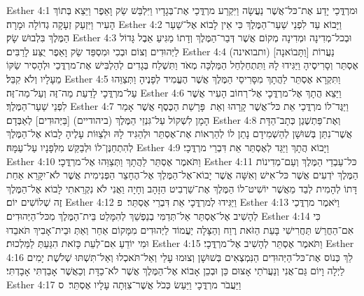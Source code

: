 Esther 4:1	וּמרְדֳּכַי יָדַע אֶת־כּל־אֲשֶׁר נַעֲשָׂה וַיִּקְרַע מרְדֳּכַי אֶת־בְּגָדָיו וַיִּלְבַּשׁ שַׂק וָאֵפֶר וַיֵּצֵא בְּתוֹךְ הָעִיר וַיִּזְעַק זְעָקָה גְדוֹלָה וּמָרָה׃
Esther 4:2	וַיָּבוֹא עַד לִפְנֵי שַׁעַר־הַמֶּלֶךְ כִּי אֵין לָבוֹא אֶל־שַׁעַר הַמֶּלֶךְ בִּלְבוּשׁ שָׂק׃
Esther 4:3	וּבְכל־מְדִינָה וּמְדִינָה מְקוֹם אֲשֶׁר דְּבַר־הַמֶּלֶךְ וְדָתוֹ מַגִּיעַ אֵבֶל גָּדוֹל לַיְּהוּדִים וְצוֹם וּבְכִי וּמִסְפֵּד שַׂק וָאֵפֶר יֻצַּע לָרַבִּים׃
Esther 4:4	(ותבואינה) [וַתָּבוֹאנָה] נַעֲרוֹת אֶסְתֵּר וְסָרִיסֶיהָ וַיַּגִּידוּ לָהּ וַתִּתְחַלְחַל הַמַּלְכָּה מְאֹד וַתִּשְׁלַח בְּגָדִים לְהַלְבִּישׁ אֶת־מרְדֳּכַי וּלְהָסִיר שַׂקּוֹ מֵעָלָיו וְלֹא קִבֵּל׃
Esther 4:5	וַתִּקְרָא אֶסְתֵּר לַהֲתָךְ מִסָּרִיסֵי הַמֶּלֶךְ אֲשֶׁר הֶעֱמִיד לְפָנֶיהָ וַתְּצַוֵּהוּ עַל־מרְדֳּכָי לָדַעַת מַה־זֶּה וְעַל־מַה־זֶּה׃
Esther 4:6	וַיֵּצֵא הֲתָךְ אֶל־מרְדֳּכָי אֶל־רְחוֹב הָעִיר אֲשֶׁר לִפְנֵי שַׁעַר־הַמֶּלֶךְ׃
Esther 4:7	וַיַּגֶּד־לוֹ מרְדֳּכַי אֵת כּל־אֲשֶׁר קָרָהוּ וְאֵת  פָּרָשַׁת הַכֶּסֶף אֲשֶׁר אָמַר הָמָן לִשְׁקוֹל עַל־גִּנְזֵי הַמֶּלֶךְ (ביהודיים) [בַּיְּהוּדִים] לְאַבְּדָם׃
Esther 4:8	וְאֶת־פַּתְשֶׁגֶן כְּתָב־הַדָּת אֲשֶׁר־נִתַּן בְּשׁוּשָׁן לְהַשְׁמִידָם נָתַן לוֹ לְהַרְאוֹת אֶת־אֶסְתֵּר וּלְהַגִּיד לָהּ וּלְצַוּוֹת עָלֶיהָ לָבוֹא אֶל־הַמֶּלֶךְ לְהִתְחַנֶּן־לוֹ וּלְבַקֵּשׁ מִלְּפָנָיו עַל־עַמָּהּ׃
Esther 4:9	וַיָּבוֹא הֲתָךְ וַיַּגֵּד לְאֶסְתֵּר אֵת דִּבְרֵי מרְדֳּכָי׃
Esther 4:10	וַתֹּאמֶר אֶסְתֵּר לַהֲתָךְ וַתְּצַוֵּהוּ אֶל־מרְדֳּכָי׃
Esther 4:11	כּל־עַבְדֵי הַמֶּלֶךְ וְעַם־מְדִינוֹת הַמֶּלֶךְ יֹדְעִים אֲשֶׁר כּל־אִישׁ וְאִשָּׁה אֲשֶׁר יָבוֹא־אֶל־הַמֶּלֶךְ אֶל־הֶחָצֵר הַפְּנִימִית אֲשֶׁר לֹא־יִקָּרֵא אַחַת דָּתוֹ לְהָמִית לְבַד מֵאֲשֶׁר יוֹשִׁיט־לוֹ הַמֶּלֶךְ אֶת־שַׁרְבִיט הַזָּהָב וְחָיָה וַאֲנִי לֹא נִקְרֵאתִי לָבוֹא אֶל־הַמֶּלֶךְ זֶה שְׁלוֹשִׁים יוֹם׃
Esther 4:12	וַיַּגִּידוּ לְמרְדֳּכָי אֵת דִּבְרֵי אֶסְתֵּר׃ {פ}
Esther 4:13	וַיֹּאמֶר מרְדֳּכַי לְהָשִׁיב אֶל־אֶסְתֵּר אַל־תְּדַמִּי בְנַפְשֵׁךְ לְהִמָּלֵט בֵּית־הַמֶּלֶךְ מִכּל־הַיְּהוּדִים׃
Esther 4:14	כִּי אִם־הַחֲרֵשׁ תַּחֲרִישִׁי בָּעֵת הַזֹּאת רֶוַח וְהַצָּלָה יַעֲמוֹד לַיְּהוּדִים מִמָּקוֹם אַחֵר וְאַתְּ וּבֵית־אָבִיךְ תֹּאבֵדוּ וּמִי יוֹדֵעַ אִם־לְעֵת כָּזֹאת הִגַּעַתְּ לַמַּלְכוּת׃
Esther 4:15	וַתֹּאמֶר אֶסְתֵּר לְהָשִׁיב אֶל־מרְדֳּכָי׃
Esther 4:16	לֵךְ כְּנוֹס אֶת־כּל־הַיְּהוּדִים הַנִּמְצְאִים בְּשׁוּשָׁן וְצוּמוּ עָלַי וְאַל־תֹּאכְלוּ וְאַל־תִּשְׁתּוּ שְׁלֹשֶׁת יָמִים לַיְלָה וָיוֹם גַּם־אֲנִי וְנַעֲרֹתַי אָצוּם כֵּן וּבְכֵן אָבוֹא אֶל־הַמֶּלֶךְ אֲשֶׁר לֹא־כַדָּת וְכַאֲשֶׁר אָבַדְתִּי אָבָדְתִּי׃
Esther 4:17	וַיַּעֲבֹר מרְדֳּכָי וַיַּעַשׂ כְּכֹל אֲשֶׁר־צִוְּתָה עָלָיו אֶסְתֵּר׃ {ס}        

